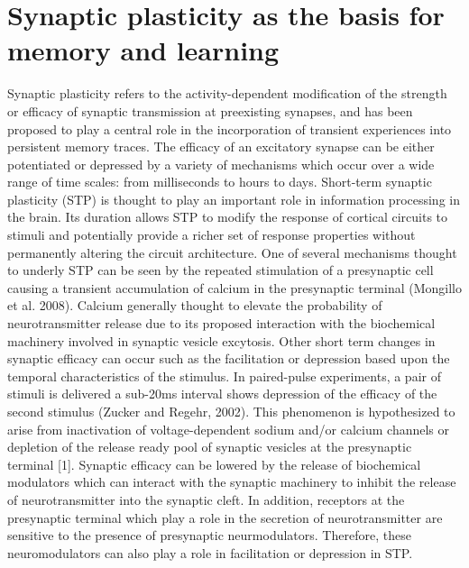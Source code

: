 \documentclass{ucetd}
\begin{document}
\section{Synaptic plasticity as the basis for memory and learning}

Synaptic plasticity refers to the activity-dependent modification of the strength or efficacy of synaptic transmission at preexisting synapses, and has been proposed to play a central role in the incorporation of transient experiences into persistent memory traces. The efficacy of an excitatory synapse can be either potentiated or depressed by a variety of mechanisms which occur over a wide range of time scales: from milliseconds to hours to days. Short-term synaptic plasticity (STP) is thought to play an important role in information processing in the brain. Its duration allows STP to modify the response of cortical circuits to stimuli and potentially provide a richer set of response properties without permanently altering the circuit architecture. One of several mechanisms thought to underly STP can be seen by the repeated stimulation of a presynaptic cell causing a transient accumulation of calcium in the presynaptic terminal (Mongillo et al. 2008). Calcium generally thought to elevate the probability of neurotransmitter release due to its proposed interaction with the biochemical machinery involved in synaptic vesicle excytosis. Other short term changes in synaptic efficacy can occur such as the facilitation or depression based upon the temporal characteristics of the stimulus. In paired-pulse experiments, a pair of stimuli is delivered a sub-20ms interval shows depression of the efficacy of the second stimulus (Zucker and Regehr, 2002). This phenomenon is hypothesized to arise from inactivation of voltage-dependent sodium and/or calcium channels or depletion of the release ready pool of synaptic vesicles at the presynaptic terminal [1]. Synaptic efficacy can be lowered by the release of biochemical modulators which can interact with the synaptic machinery to inhibit the release of neurotransmitter into the synaptic cleft. In addition, receptors at the presynaptic terminal which play a role in the secretion of neurotransmitter are sensitive to the presence of presynaptic neurmodulators. Therefore, these neuromodulators can also play a role in facilitation or depression in STP.
\end{document}

